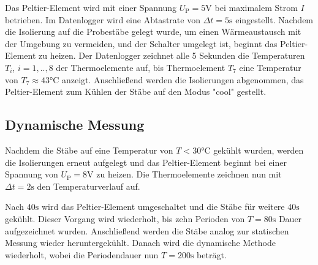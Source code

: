 Das Peltier-Element wird mit einer Spannung $U_\mathup{P}=5 \si{ \volt}$ bei maximalem Strom $I$ betrieben. 
Im Datenlogger wird eine Abtastrate von $\Delta{t}=5\si{ \second}$ eingestellt. 
Nachdem die Isolierung auf die Probestäbe gelegt wurde, um einen Wärmeaustausch mit der Umgebung zu vermeiden, und der Schalter umgelegt ist, beginnt das Peltier-Element zu heizen. 
Der Datenlogger zeichnet alle 5 Sekunden die Temperaturen $T_i$, $i=1,..,8$ der Thermoelemente auf, bis Thermoelement $T_7$ eine Temperatur von $T_\mathup{7}\approx 43\si{ \degreeCelsius}$ anzeigt. 
Anschließend werden die Isolierungen abgenommen, das Peltier-Element zum Kühlen der Stäbe auf den Modus "cool" gestellt.

\subsection{Dynamische Messung}
Nachdem die Stäbe auf eine Temperatur von $T<30\si{ \degreeCelsius}$ gekühlt wurden, werden die Isolierungen erneut aufgelegt und das Peltier-Element beginnt bei einer Spannung von $U_\mathup{P}=8 \si{\volt}$ zu heizen. Die Thermoelemente zeichnen nun mit $\Delta{t}=2\si{ \second}$ den Temperaturverlauf auf.

Nach $40\si{ \second}$ wird das Peltier-Element umgeschaltet und die Stäbe für weitere $40\si{ \second}$ gekühlt. 
Dieser Vorgang wird wiederholt, bis zehn Perioden von $T=80\si{ \second}$ Dauer aufgezeichnet wurden. 
Anschließend werden die Stäbe analog zur statischen Messung wieder heruntergekühlt. 
Danach wird die dynamische Methode wiederholt, wobei die Periodendauer nun $T=200\si{ \second}$ beträgt. 
